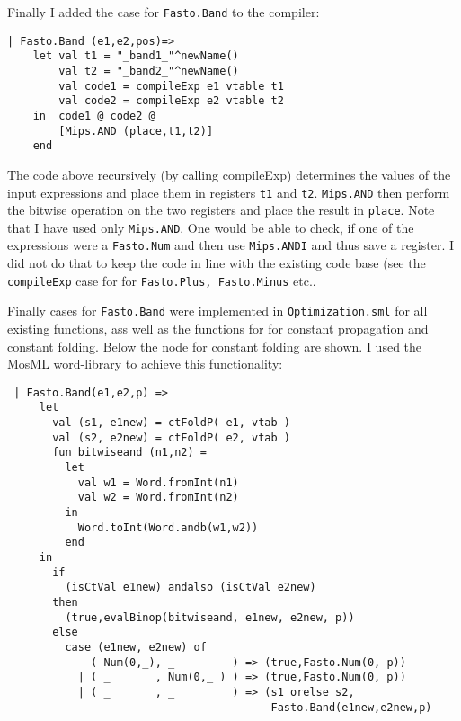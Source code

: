 \documentclass[11pt,a4paper]{article}
\begin{document}
Finally I added the case for \texttt{Fasto.Band} to the compiler:
\begin{lstlisting}
| Fasto.Band (e1,e2,pos)=>
    let val t1 = "_band1_"^newName()
        val t2 = "_band2_"^newName()
        val code1 = compileExp e1 vtable t1
        val code2 = compileExp e2 vtable t2
    in  code1 @ code2 @
        [Mips.AND (place,t1,t2)]
    end
\end{lstlisting}
The code above recursively (by calling compileExp) determines the
values of the input expressions and place them in registers \texttt{t1} and
\texttt{t2}. \texttt{Mips.AND} then perform the bitwise operation on the two
registers and place the result in \texttt{place}. Note that I have used only
\texttt{Mips.AND}. One would be able to check, if one of the expressions were a
\texttt{Fasto.Num} and then use \texttt{Mips.ANDI} and thus save a register.
I did not do that to keep the code in line with the existing code base (see the
\texttt{compileExp} case for for \texttt{Fasto.Plus, Fasto.Minus} etc..

Finally cases for \texttt{Fasto.Band} were implemented in
\texttt{Optimization.sml} for all existing functions, ass well as the
functions for for constant propagation and constant folding. Below the node
for constant folding are shown. I used the MosML word-library to achieve this
functionality:
\begin{lstlisting}
 | Fasto.Band(e1,e2,p) =>
     let
       val (s1, e1new) = ctFoldP( e1, vtab )
       val (s2, e2new) = ctFoldP( e2, vtab )
       fun bitwiseand (n1,n2) =
         let
           val w1 = Word.fromInt(n1)
           val w2 = Word.fromInt(n2)
         in
           Word.toInt(Word.andb(w1,w2))
         end
     in
       if
         (isCtVal e1new) andalso (isCtVal e2new)
       then
         (true,evalBinop(bitwiseand, e1new, e2new, p))
       else
         case (e1new, e2new) of
             ( Num(0,_), _         ) => (true,Fasto.Num(0, p))
           | ( _       , Num(0,_ ) ) => (true,Fasto.Num(0, p))
           | ( _       , _         ) => (s1 orelse s2,
                                         Fasto.Band(e1new,e2new,p)
\end{lstlisting}
\end{document}
